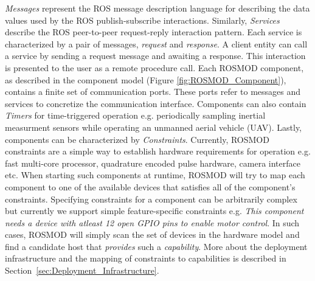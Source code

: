 \emph{Messages} represent the ROS message description language for
describing the data values used by the ROS publish-subscribe
interactions. Similarly, \emph{Services} describe the ROS peer-to-peer
request-reply interaction pattern. Each service is characterized by a
pair of messages, \emph{request} and \emph{response}. A client entity
can call a service by sending a request message and awaiting a
response. This interaction is presented to the user as a remote
procedure call. Each ROSMOD component, as described in the component
model (Figure \ref{fig:ROSMOD_Component}), contains a finite set of
communication ports. These ports refer to messages and services to
concretize the communication interface. Components can also contain
\emph{Timers} for time-triggered operation e.g. periodically sampling
inertial measurment sensors while operating an unmanned aerial vehicle
(UAV). Lastly, components can be characterized by
\emph{Constraints}. Currently, ROSMOD constraints are a simple way to
establish hardware requirements for operation e.g. fast multi-core
processor, quadrature encoded pulse hardware, camera interface
etc. When starting such components at runtime, ROSMOD will try to map
each component to one of the available devices that satisfies all of
the component's constraints. Specifying constraints for a component
can be arbitrarily complex but currently we support simple
feature-specific constraints e.g. \emph{This component needs a device
  with atleast 12 open GPIO pins to enable motor control}. In such
cases, ROSMOD will simply scan the set of devices in the hardware
model and find a candidate host that \emph{provides} such a
\emph{capability}.  More about the deployment infrastructure and the
mapping of constraints to capabilities is described in
Section~\ref{sec:Deployment_Infrastructure}.

